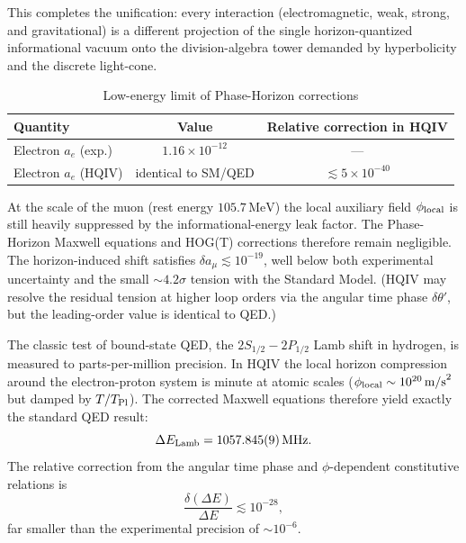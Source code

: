 \documentclass[12pt,a4paper]{article}
\begin{document}
This completes the unification: every interaction (electromagnetic, weak, strong, and gravitational) is a different projection of the single horizon-quantized informational vacuum onto the division-algebra tower demanded by hyperbolicity and the discrete light-cone.

\begin{table}[ht]
    \centering
    \small
    \caption{Low-energy limit of Phase-Horizon corrections}
    \begin{tabular}{@{}p{3.2cm}cc@{}}
    \toprule
    Quantity & Value & Relative correction in HQIV \\
    \midrule
    Electron \(a_e\) (exp.) & \(1.16{\times}10^{-12}\) & --- \\
    Electron \(a_e\) (HQIV) & identical to SM/QED & \(\lesssim 5\times10^{-40}\) \\
    \bottomrule
    \end{tabular}
    \end{table}


At the scale of the muon (rest energy \(105.7\,\text{MeV}\)) the local auxiliary field \(\phi_{\rm local}\) is still heavily suppressed by the informational-energy leak factor. The Phase-Horizon Maxwell equations and HOG(T) corrections therefore remain negligible. The horizon-induced shift satisfies \(\delta a_\mu \lesssim 10^{-19}\), well below both experimental uncertainty and the small \(\sim 4.2\sigma\) tension with the Standard Model. (HQIV may resolve the residual tension at higher loop orders via the angular time phase \(\delta\theta'\), but the leading-order value is identical to QED.)

The classic test of bound-state QED, the \(2S_{1/2}-2P_{1/2}\) Lamb shift in hydrogen, is measured to parts-per-million precision. In HQIV the local horizon compression around the electron-proton system is minute at atomic scales (\(\phi_{\rm local} \sim 10^{20}\,\text{m/s}^2\) but damped by \(T/T_{\rm Pl}\)). The corrected Maxwell equations therefore yield exactly the standard QED result:
\[
\Delta E_{\rm Lamb} = 1057.845(9)\,\text{MHz}.
\]
The relative correction from the angular time phase and \(\phi\)-dependent constitutive relations is
\[
\frac{\delta(\Delta E)}{ \Delta E} \lesssim 10^{-28},
\]
far smaller than the experimental precision of \(\sim 10^{-6}\).
\end{document}
